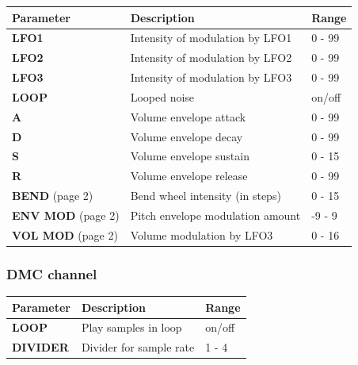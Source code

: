 \documentclass[a4paper, 12p, titlepaget]{book}
\begin{document}
\begin{tabular}{l | l | l}
Parameter & Description & Range\\ \hline
\textbf{LFO1} & Intensity of modulation by LFO1 & 0 - 99\\
\textbf{LFO2} & Intensity of modulation by LFO2 & 0 - 99\\
\textbf{LFO3} & Intensity of modulation by LFO3 & 0 - 99\\
\textbf{LOOP} & Looped noise & on/off\\
\textbf{A} & Volume envelope attack & 0 - 99\\
\textbf{D} & Volume envelope decay & 0 - 99\\
\textbf{S} & Volume envelope sustain & 0 - 15\\
\textbf{R} & Volume envelope release & 0 - 99\\
\textbf{BEND} (page 2) & Bend wheel intensity (in steps) & 0 - 15\\
\textbf{ENV MOD} (page 2) & Pitch envelope modulation amount & -9 - 9\\
\textbf{VOL MOD} (page 2) & Volume modulation by LFO3 & 0 - 16\\
\end{tabular}

\subsubsection{DMC channel}


\begin{tabular}{l | l | l}
Parameter & Description & Range\\ \hline
\textbf{LOOP} & Play samples in loop & on/off\\
\textbf{DIVIDER} & Divider for sample rate & 1 - 4\\
\end{tabular}
\end{document}
